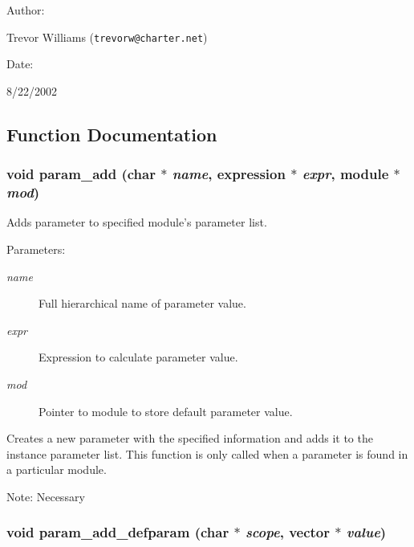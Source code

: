 \begin{Desc}
\item[Author: ]\par
Trevor Williams ({\tt trevorw@charter.net}) \end{Desc}
\begin{Desc}
\item[Date: ]\par
8/22/2002\end{Desc}


\subsection{Function Documentation}
\subsubsection{\setlength{\rightskip}{0pt plus 5cm}void param\_\-add (char $\ast$ {\em name}, {\bf expression} $\ast$ {\em expr}, {\bf module} $\ast$ {\em mod})}\label{param_8h_a1}


Adds parameter to specified module's parameter list.

\begin{Desc}
\item[Parameters: ]\par
\begin{description}
\item[{\em 
name}]Full hierarchical name of parameter value. \item[{\em 
expr}]Expression to calculate parameter value. \item[{\em 
mod}]Pointer to module to store default parameter value.\end{description}
\end{Desc}
Creates a new parameter with the specified information and adds it to the  instance parameter list. This function is only called when a parameter is found in a particular module.

Note: Necessary 
\subsubsection{\setlength{\rightskip}{0pt plus 5cm}void param\_\-add\_\-defparam (char $\ast$ {\em scope}, {\bf vector} $\ast$ {\em value})}\label{param_8h_a2}


